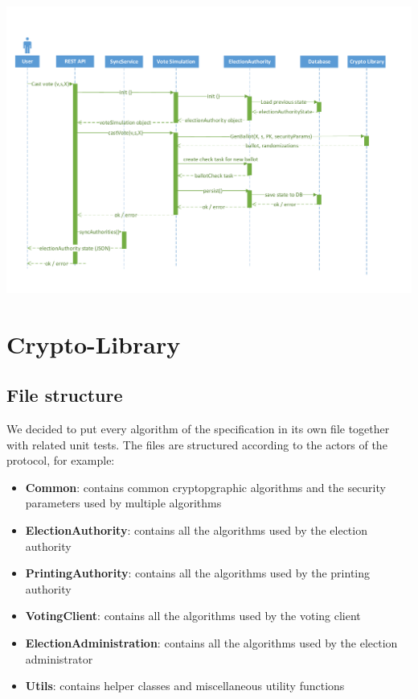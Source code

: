 \begin{center}
\includegraphics[scale=0.62]{assets/votecastingDiagram.pdf}
\label{Vote casting sequence diagram}%
\end{center}

\section{Crypto-Library}

\subsection{File structure}
We decided to put every algorithm of the specification in its own file together with related unit tests. The files are structured according to the actors of the protocol, for example:

\begin{itemize}
	\item \textbf{Common}: contains common cryptopgraphic algorithms and the security parameters used by multiple algorithms
	\item \textbf{ElectionAuthority}: contains all the algorithms used by the election authority
	\item \textbf{PrintingAuthority}: contains all the algorithms used by the printing authority
	\item \textbf{VotingClient}: contains all the algorithms used by the voting client
	\item \textbf{ElectionAdministration}: contains all the algorithms used by the election administrator
	\item \textbf{Utils}: contains helper classes and miscellaneous utility functions
\end{itemize}

